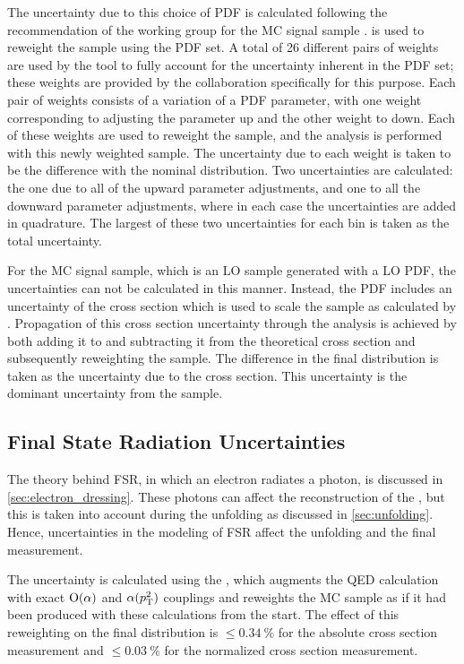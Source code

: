 The uncertainty due to this choice of PDF is calculated following the
recommendation of the \PDFforLHC working group for the \POWHEG MC signal sample
\cite{botje_2011}. \PDFWeightProducer is used to reweight the \POWHEG sample
using the \CTten PDF set. A total of \num{26} different pairs of weights are
used by the tool to fully account for the uncertainty inherent in the PDF set;
these weights are provided by the \CTten collaboration specifically for this
purpose. Each pair of weights consists of a variation of a PDF parameter, with
one weight corresponding to adjusting the parameter up and the other weight to
down. Each of these weights are used to reweight the \POWHEG sample, and the
analysis is performed with this newly weighted sample. The uncertainty due to
each weight is taken to be the difference with the nominal \phistar
distribution. Two uncertainties are calculated: the one due to all of the
upward parameter adjustments, and one to all the downward parameter
adjustments, where in each case the uncertainties are added in quadrature. The
largest of these two uncertainties for each \phistar bin is taken as the total
uncertainty.

For the \MADGRAPH MC signal sample, which is an LO sample generated with a LO
PDF, the uncertainties can not be calculated in this manner. Instead, the PDF
includes an uncertainty of the cross section which is used to scale the sample
as calculated by \FEWZ. Propagation of this cross section uncertainty through
the analysis is achieved by both adding it to and subtracting it from the
theoretical cross section and subsequently reweighting the \MADGRAPH sample.
The difference in the final \phistar distribution is taken as the uncertainty
due to the \FEWZ cross section. This uncertainty is the dominant uncertainty
from the \MADGRAPH sample.

\subsection{Final State Radiation Uncertainties}
\label{ssec:fsr_uncertainties}

The theory behind FSR, in which an electron radiates a photon, is discussed in
\cref{sec:electron_dressing}. These photons can affect the reconstruction of
the \Z, but this is taken into account during the unfolding as discussed in
\cref{sec:unfolding}. Hence, uncertainties in the modeling of FSR affect the
unfolding and the final measurement.

The uncertainty is calculated using the \FSRWeightProducer, which augments the
\PYTHIA QED calculation with exact $\operatorname{O}\!\left( \alpha \right)$ and $\alpha(p_{\mathrm{T}}^{2})$
couplings and reweights the MC sample as if it had been produced with these
calculations from the start. The effect of this reweighting on the final
\phistar distribution is $\le \SI{0.34}{\percent}$ for the absolute cross
section measurement and $\le \SI{0.03}{\percent}$ for the normalized cross
section measurement.

